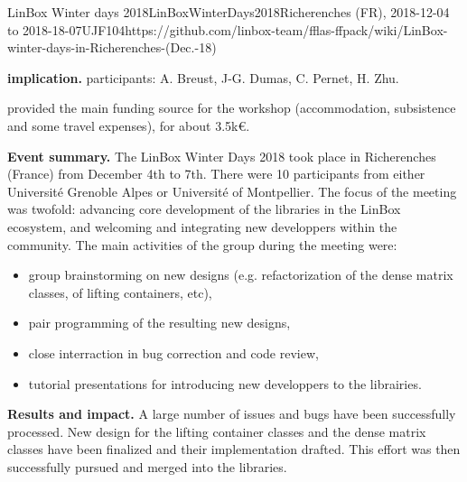 \begin{event}{LinBox Winter days 2018}{LinBoxWinterDays2018}{Richerenches (FR),
2018-12-04 to 2018-18-07}{UJF}{10}{4}{https://github.com/linbox-team/fflas-ffpack/wiki/LinBox-winter-days-in-Richerenches-(Dec.-18)}

\textbf{\ODK implication.} \ODK participants: A. Breust, J-G. Dumas, C. Pernet, H. Zhu.

\ODK provided the main funding source for the workshop (accommodation,
subsistence and some travel expenses), for about 3.5k\euro.

\textbf{Event summary.} The LinBox Winter Days 2018 took place in Richerenches
(France) from December 4th to 7th.
There were 10 participants from either Université Grenoble Alpes or Université of Montpellier. The focus of the meeting
was twofold: advancing core development of the libraries in the LinBox ecosystem, and welcoming and integrating new
developpers within the community. The main activities of the group during the meeting were:
\begin{itemize}
\item group brainstorming on new designs (e.g. refactorization of the dense matrix classes, of lifting containers, etc),
\item pair programming of the resulting new designs,
\item close interraction in bug correction and code review,
\item tutorial presentations for introducing new developpers to the librairies.
\end{itemize}

\textbf{Results and impact.} A large number of issues and bugs have been successfully processed. New design for the
lifting container classes and the dense matrix classes have been finalized and their implementation drafted. This effort
was then successfully pursued and merged into the libraries.

\end{event}
